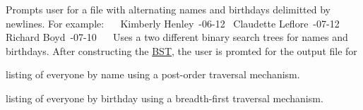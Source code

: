 Prompts user for a file with alternating names and birthdays delimitted by newlines. For example\+:~\newline
~\newline
Kimberly Henley~-\/06-\/12~\newline
Claudette Leflore~-\/07-\/12~\newline
Richard Boyd~-\/07-\/10~\newline
~\newline
Uses a two different binary search trees for names and birthdays. After constructing the \hyperlink{class_b_s_t}{B\+ST}, the user is promted for the output file for
\begin{DoxyItemize}
\item listing of everyone by name using a post-\/order traversal mechanism.
\item listing of everyone by birthday using a breadth-\/first traversal mechanism. 
\end{DoxyItemize}